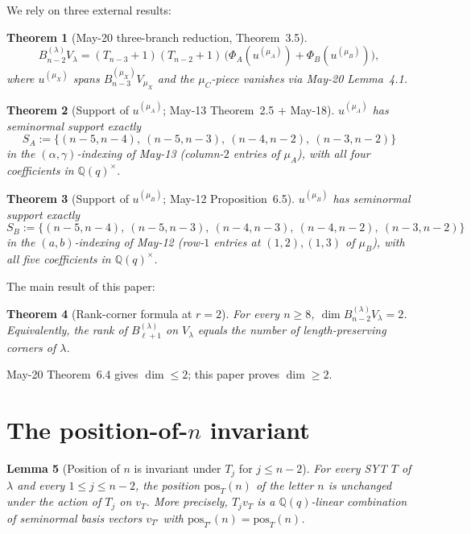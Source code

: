 \documentclass[11pt]{article}
\newtheorem{theorem}{Theorem}
\newtheorem{lemma}[theorem]{Lemma}
\theoremstyle{definition}
\begin{document}
We rely on three external results:

\begin{theorem}[May-20 three-branch reduction, Theorem~3.5]\label{thm:reduction}
\[
   B_{n-2}^{(\lambda)} V_\lambda
   = (T_{n-3}{+}1)(T_{n-2}{+}1)\,
     \big(\Phi_A(u^{(\mu_A)}) + \Phi_B(u^{(\mu_B)})\big),
\]
where $u^{(\mu_X)}$ spans $B_{n-3}^{(\mu_X)} V_{\mu_X}$ and the
$\mu_C$-piece vanishes via May-20 Lemma~4.1.
\end{theorem}

\begin{theorem}[Support of $u^{(\mu_A)}$; May-13 Theorem~2.5 +
May-18]\label{thm:uA}
$u^{(\mu_A)}$ has seminormal support exactly
\[
   S_A := \{(n{-}5, n{-}4),\ (n{-}5, n{-}3),\ (n{-}4, n{-}2),\
   (n{-}3, n{-}2)\}
\]
in the $(\alpha, \gamma)$-indexing of May-13 (column-$2$ entries of
$\mu_A$), with all four coefficients in $\mathbb{Q}(q)^\times$.
\end{theorem}

\begin{theorem}[Support of $u^{(\mu_B)}$; May-12 Proposition~6.5]\label{thm:uB}
$u^{(\mu_B)}$ has seminormal support exactly
\[
   S_B := \{(n{-}5, n{-}4),\ (n{-}5, n{-}3),\ (n{-}4, n{-}3),\
   (n{-}4, n{-}2),\ (n{-}3, n{-}2)\}
\]
in the $(a, b)$-indexing of May-12 (row-$1$ entries at $(1,2),(1,3)$
of $\mu_B$), with all five coefficients in $\mathbb{Q}(q)^\times$.
\end{theorem}

The main result of this paper:

\begin{theorem}[Rank-corner formula at $r=2$]\label{thm:main}
For every $n \ge 8$, $\dim B_{n-2}^{(\lambda)} V_\lambda = 2$.
Equivalently, the rank of $B_{\ell+1}^{(\lambda)}$ on $V_\lambda$
equals the number of length-preserving corners of $\lambda$.
\end{theorem}

May-20 Theorem~6.4 gives $\dim \le 2$; this paper proves
$\dim \ge 2$.

\section{The position-of-$n$ invariant}\label{sec:invariant}

\begin{lemma}[Position of $n$ is invariant under $T_j$ for $j \le n-2$]\label{lem:n-invariant}
For every SYT $T$ of $\lambda$ and every $1 \le j \le n-2$, the
position $\mathrm{pos}_T(n)$ of the letter $n$ is unchanged under
the action of $T_j$ on $v_T$. More precisely, $T_j v_T$ is a
$\mathbb{Q}(q)$-linear combination of seminormal basis vectors
$v_{T'}$ with $\mathrm{pos}_{T'}(n) = \mathrm{pos}_T(n)$.
\end{lemma}
\end{document}
